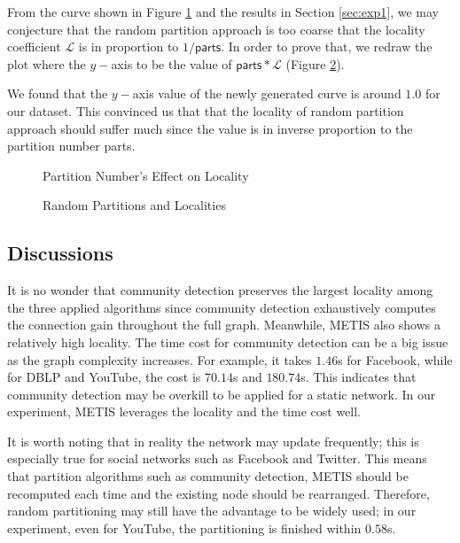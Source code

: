 From the curve shown in Figure \ref{fig:exp2} and the results in Section \ref{sec:exp1}, we may conjecture that the random partition approach is too coarse that the locality coefficient $\mathcal{L}$ is in proportion to $1/\textsf{parts}$. In order to prove that, we redraw the plot where the $y-$axis to be the value of $\textsf{parts}*\mathcal{L}$ (Figure \ref{fig:rnd}).

We found that the $y-$axis value of the newly generated curve is around $1.0$ for our dataset. This convinced us that that the locality of random partition approach should suffer much since the value is in inverse proportion to the partition number \textsf{parts}.

\begin{figure}[t]
  \hfill
  \hfill
  \hfill
  \centering
  \caption{Partition Number's Effect on Locality}\label{fig:exp2}
\end{figure}

\begin{figure}[t]
\label{fig:rnd}
  \hfill
  \hfill
  \centering
  
  \caption{Random Partitions and Localities}\label{fig:rnd}
\end{figure}

\subsection{Discussions}
It is no wonder that community detection preserves the largest locality among the three applied algorithms since community detection exhaustively computes the connection gain throughout the full graph. Meanwhile, METIS also shows a relatively high locality. The time cost for community detection can be a big issue as the graph complexity increases. For example, it takes $1.46$s for Facebook, while for DBLP and YouTube, the cost is $70.14$s and $180.74$s. This indicates that community detection may be overkill to be applied for a static network. In our experiment, METIS leverages the locality and the time cost well.

It is worth noting that in reality the network may update frequently; this is especially true for social networks such as Facebook and Twitter. This means that partition algorithms such as community detection, METIS should be recomputed each time and the existing node should be rearranged. Therefore, random partitioning may still have the advantage to be widely used; in our experiment, even for YouTube, the partitioning is finished within $0.58$s.